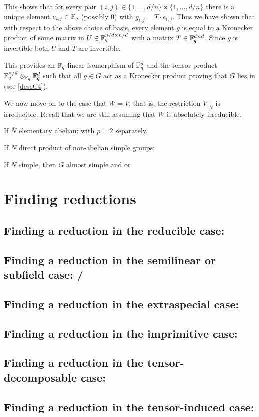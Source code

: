 This shows that for every pair $(i,j) \in \{ 1, \ldots, d/n \} \times 
\{ 1, \ldots, d/n \}$ there
is a unique element $e_{i,j} \in \mathbb{F}_q$ (possibly $0$) with 
$g_{i,j} = T \cdot e_{i,j}$. Thus we have shown that with respect to
the above choice of basis, every element $g$ is equal to a Kronecker 
product of some matrix in $U \in \mathbb{F}_q^{n/d \times n/d}$ with a matrix
$T \in \mathbb{F}_q^{d \times d}$. Since $g$ is invertible both 
$U$ and $T$ are invertible. 

This provides an $\mathbb{F}_q$-linear isomorphism of 
$\mathbb{F}_q^d$ and the tensor product $\mathbb{F}_q^{n/d} \otimes_{\mathbb{F}_q} \mathbb{F}_q^d$
such that all $g \in G$ act as a Kronecker product proving that
$G$ lies in  (see \ref{descC4}).

We now move on to the case that $W = V$, that is, the restriction
$V|_N$ is irreducible. Recall that we are still assuming that $W$ is
absolutely irreducible.

If $\bar N$ elementary abelian:  with $p=2$ separately.

If $\bar N$ direct product of non-abelian simple groups: 

If $\bar N$ simple, then $G$ almost simple and  or 

\section{Finding reductions}
\label{findred}

\subsection{Finding a reduction in the reducible case: }
\label{solveC1}

\subsection{Finding a reduction in the semilinear or subfield case: /}
\label{solveC3C5}

\subsection{Finding a reduction in the extraspecial case: }
\label{solveC6}

\subsection{Finding a reduction in the imprimitive case: }
\label{solveC2}

\subsection{Finding a reduction in the tensor-decomposable case: }
\label{solveC4}

\subsection{Finding a reduction in the tensor-induced case: }
\label{solveC7}



